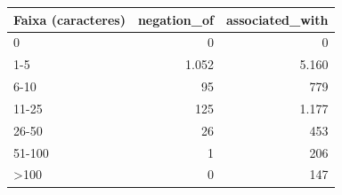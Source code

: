 \begin{tabular}{lrr}
\toprule
Faixa (caracteres) & negation\_of & associated\_with \\
\midrule
0 & 0 & 0 \\
1-5 & 1.052 & 5.160 \\
6-10 & 95 & 779 \\
11-25 & 125 & 1.177 \\
26-50 & 26 & 453 \\
51-100 & 1 & 206 \\
>100 & 0 & 147 \\
\bottomrule
\end{tabular}
